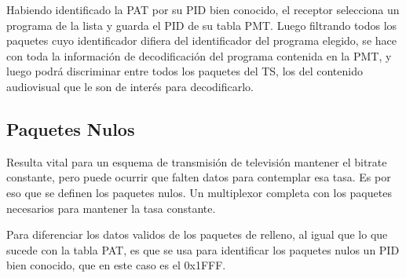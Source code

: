 	Habiendo identificado la PAT por su PID bien conocido, el receptor selecciona un programa de la lista y guarda el PID de su tabla PMT. Luego filtrando todos los paquetes cuyo identificador difiera del identificador del programa elegido, se hace con toda la información de decodificación del programa contenida en la PMT, y luego podrá discriminar entre todos los paquetes del TS, los del contenido audiovisual que le son de interés para decodificarlo. 
 
	
	\subsection{Paquetes Nulos}
	
	Resulta vital para un esquema de transmisión de televisión mantener el bitrate constante, pero puede ocurrir que falten datos para contemplar esa tasa. Es por eso que se definen los paquetes nulos. Un multiplexor completa con los paquetes necesarios para mantener la tasa constante.
	
	Para diferenciar los datos validos de los paquetes de relleno, al igual que lo que sucede con la tabla PAT, es que se usa para identificar los paquetes nulos un PID bien conocido, que en este caso es el 0x1FFF.

